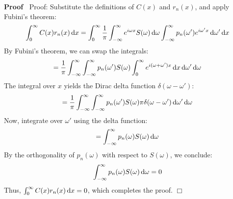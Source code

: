 \documentclass{article}
\newcommand{\mathd}{\mathrm{d}}
\newenvironment{proof}{\noindent\textbf{Proof\ }}{\hspace*{\fill}$\Box$\medskip}
\providecommand{\mathd}{\mathrm{d}}
\begin{document}
\begin{proof}
  Proof: Substitute the definitions of $C (x)$ and $r_n (x)$, and apply
  Fubini's theorem:
  \begin{equation}
    \int_0^{\infty} C (x) r_n (x)  \hspace{0.17em} \mathd x = \int_0^{\infty}
    \frac{1}{\pi}  \int_{- \infty}^{\infty} e^{i \omega x} S (\omega) 
    \hspace{0.17em} \mathd \omega \int_{- \infty}^{\infty} p_n (\omega') e^{i
    \omega' x}  \hspace{0.17em} \mathd \omega'  \hspace{0.17em} \mathd x
  \end{equation}
  By Fubini's theorem, we can swap the integrals:
  \begin{equation}
    = \frac{1}{\pi}  \int_{- \infty}^{\infty} \int_{- \infty}^{\infty} p_n
    (\omega') S (\omega)  \int_0^{\infty} e^{i (\omega + \omega') x} 
    \hspace{0.17em} \mathd x \hspace{0.17em} \mathd \omega'  \hspace{0.17em}
    \mathd \omega
  \end{equation}
  The integral over $x$ yields the Dirac delta function $\delta (\omega -
  \omega')$:
  \begin{equation}
    = \frac{1}{\pi}  \int_{- \infty}^{\infty} \int_{- \infty}^{\infty} p_n
    (\omega') S (\omega) \pi \delta (\omega - \omega')  \hspace{0.17em} \mathd
    \omega'  \hspace{0.17em} \mathd \omega
  \end{equation}
  Now, integrate over $\omega'$ using the delta function:
  \begin{equation}
    = \int_{- \infty}^{\infty} p_n (\omega) S (\omega)  \hspace{0.17em} \mathd
    \omega
  \end{equation}
  By the orthogonality of $p_n (\omega)$ with respect to $S (\omega)$, we
  conclude:
  \begin{equation}
    \int_{- \infty}^{\infty} p_n (\omega) S (\omega)  \hspace{0.17em} \mathd
    \omega = 0
  \end{equation}
  Thus, $\int_0^{\infty} C (x) r_n (x)  \hspace{0.17em} \mathd x = 0$, which
  completes the proof.
\end{proof}

\
\end{document}
